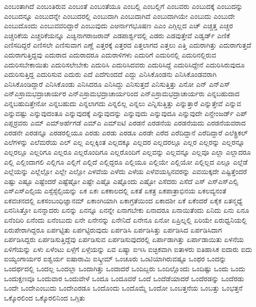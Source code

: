 {ಎಂಬಂತಾಗಿದೆ
ಎಂಬಂತಿರುವ
ಎಂಬಂತೆ
ಎಂಬಂತೆಯೂ
ಎಂಬಲ್ಲಿ
ಎಂಬಲ್ಲಿಗೆ
ಎಂಬವರು
ಎಂಬುದಕ್ಕೆ
ಎಂಬುದನ್ನು
ಎಂಬುದನ್ನೂ
ಎಂಬುದನ್ನೇ
ಎಂಬುದರಲ್ಲಿ
ಎಂಬುದಾಗಿ
ಎಂಬುದಾಗಿದೆ
ಎಂಬುದಾಗಿಯೇ
ಎಂಬುದು
ಎಂಬುದೇ
ಎಂಬುದೊಂದು
ಎಂಬುವವರಿದ್ದಾರೆ
ಎಂಬುವುದು
ಎಆರ್ನಾಗಭೂಷಣ
ಎಎಂ
ಎಗ್ಗಿಲ್ಲದ
ಎಚ್
ಎಚ್ಚತ್ತ
ಎಚ್ಚರ
ಎಚ್ಚರಿಕೆಯ
ಎಚ್ಚರಿಕೆಯನ್ನೂ
ಎಚ್ವಿನಾಗರಾಜರಾವ್
ಎಡಪಾರ್ಶ್ವದಲ್ಲಿ
ಎಡರು
ಎಡವುತ್ತೇವೆ
ಎಡ್ವರ್ಡ್
ಎಣಿಕೆ
ಎಣಿಸದಿದ್ದರೆ
ಎಣಿಸಲೇ
ಎಣಿಸುವಾಗ
ಎಣ್ಣೆ
ಎತ್ತರಕ್ಕೆ
ಎತ್ತರದ
ಎತ್ತಲಾಗದ
ಎತ್ತಲು
ಎತ್ತಿ
ಎದುರಾಗಿತ್ತು
ಎದುರಾಗುತ್ತದೆ
ಎದುರಾಗುತ್ತಿದ್ದವು
ಎದುರಾದ
ಎದುರಾದರೂ
ಎದುರಾಳಿಗಳು
ಎದುರಿಗೆ
ಎದುರಿನಲ್ಲಿ
ಎದುರಿನಲ್ಲಿರುವ
ಎದುರಿಸಬೇಕಾಯಿತು
ಎದುರಿಸಲೇಬೇಕು
ಎದುರಿಸಿ
ಎದುರಿಸಿದವರು
ಎದುರಿಸಿದ್ದೆ
ಎದುರಿಸಿದ್ದೇನೆ
ಎದುರಿಸಿರುವುದೂ
ಎದುರಿಸುತ್ತಿದ್ದ
ಎದುರಿಸುವ
ಎದುರು
ಎದೆ
ಎದೆಗುಂದದೆ
ಎದ್ದು
ಎನಿಸಿಕೊಂಡನು
ಎನಿಸಿಕೊಂಡವರಾಗಿ
ಎನಿಸಿಕೊಂಡಿದ್ದಾರೆ
ಎನಿಸಿಕೊಂಡು
ಎನಿಸಿದರೂ
ಎನಿಸಿದ್ದು
ಎನಿಸುತ್ತದೆ
ಎನಿಸುತ್ತಿತ್ತು
ಎನೋ
ಎನ್
ಎನ್ಎಸ್
ಎನ್ಎಸ್ರಾಮಭದ್ರಾಚಾರ್ಯರ
ಎನ್ಎಸ್ರಾಮಭದ್ರಾಚಾರ್ಯರಿಂದ
ಎನ್ಎಸ್ರಾಮಭದ್ರಾಚಾರ್ಯರು
ಎನ್ನಬಹುದಾದ
ಎನ್ನಬಹುದಿತ್ತೇನೋ
ಎನ್ನಬಹುದು
ಎನ್ನಲಾಗದು
ಎನ್ನಲಿಲ್ಲ
ಎನ್ನಲು
ಎನ್ನಿಸುತ್ತಿತ್ತು
ಎನ್ನುತ್ತಾರೆ
ಎನ್ನುತ್ತೇವೆ
ಎನ್ನುವ
ಎನ್ನುವಷ್ಟು
ಎನ್ನುವುದಂತೂ
ಎನ್ನುವುದಕ್ಕೆ
ಎನ್ನುವುದನ್ನು
ಎನ್ನುವುದು
ಎನ್ನುವುದೂ
ಎನ್ನುವುದೇ
ಎನ್ಡೇಂಜರ್ಡ್
ಎಪ್
ಎಪ್ಲರ್ರವರು
ಎಮ್
ಎಮ್ಅರ್ಹೆಗಡೆ
ಎಮ್ಎ
ಎಮ್ಐಟಿ
ಎರಡನೆ
ಎರಡನೆಯ
ಎರಡನೆಯದು
ಎರಡನೆಯವರಾದ
ಎರಡನೇ
ಎರಡನ್ನೂ
ಎರಡರಲ್ಲಿಯೂ
ಎರಡು
ಎರಡು
ಎರಡೂ
ಎರಡೇ
ಎರೆದ
ಎರೆದಿದ್ದಾನೆ
ಎರೆದಿದ್ದಾರೆ
ಎಲೆಕ್ಟ್ರಿಕಲ್
ಎಲೆಗಳನ್ನು
ಎಲೆಮರೆಯ
ಎಲ್
ಎಲ್ಲ
ಎಲ್ಲಕ್ಕಿಂತ
ಎಲ್ಲದಕ್ಕೂ
ಎಲ್ಲದರ
ಎಲ್ಲದರಲ್ಲೂ
ಎಲ್ಲರ
ಎಲ್ಲರನ್ನು
ಎಲ್ಲರನ್ನೂ
ಎಲ್ಲರಲ್ಲೂ
ಎಲ್ಲರಿಗೂ
ಎಲ್ಲರೂ
ಎಲ್ಲರೊಂದಿಗೂ
ಎಲ್ಲರೊಂದಿಗೆ
ಎಲ್ಲವನ್ನು
ಎಲ್ಲವನ್ನೂ
ಎಲ್ಲವೂ
ಎಲ್ಲಾ
ಎಲ್ಲಾದರೂ
ಎಲ್ಲಿ
ಎಲ್ಲಿಂದಾಗಲಿ
ಎಲ್ಲಿಗೂ
ಎಲ್ಲಿಗೆ
ಎಲ್ಲಿದೆ
ಎಲ್ಲಿದ್ದರೂ
ಎಲ್ಲಿಯೂ
ಎಲ್ಲಿಯೇ
ಎಲ್ಲಿಯೋ
ಎಲ್ಲಿಲ್ಲದ
ಎಲ್ಲೂ
ಎಲ್ಲೆಡೆ
ಎಲ್ಲೆಯನ್ನು
ಎಲ್ಲೆಲ್ಲೋ
ಎಲ್ಲೇ
ಎಲ್ಲೋ
ಎಳವೆಯ
ಎಳೆದು
ಎಳೆಯ
ಎಳೆವಯಸ್ಸಿನವರನ್ನು
ಎವಯಿಕ್ಕದೇ
ಎಷ್ಟಿತ್ತೆಂದರೆ
ಎಷ್ಟು
ಎಷ್ಟೂ
ಎಷ್ಟೆಂದರೆ
ಎಷ್ಟೆಷ್ಟೋ
ಎಷ್ಟೇ
ಎಷ್ಟೊ
ಎಷ್ಟೊಂದು
ಎಷ್ಟೋ
ಎಸೆದರು
ಎಸೆದೆ
ಎಸ್
ಎಸ್ಎಸ್ಎಲ್ಸಿ
ಎಸ್ಎಸ್ಎಲ್ಸಿಯ
ಎಸ್ಸೆಸ್ಸೆಲ್ಸಿಯನ್ನು
ಏಕ
ಏಕಃ
ಏಕಕಾಲದಲ್ಲಿ
ಏಕತೆ
ಏಕತ್ರ
ಏಕಪಾತ್ರಾಭಿನಯ
ಏಕಲವ್ಯನಂತೆ
ಏಕವಚನದಲ್ಲಿ
ಏಕಸಂಬಂಧಿಜ್ಞಾನಮ್
ಏಕಾಂಗಿಯಾಗಿ
ಏಕಾಗ್ರತೆಯಿಂದ
ಏಕಾದಶೀ
ಏಕೆ
ಏಕೆಂದರೆ
ಏಕೈಕ
ಏತನ್ಮಧ್ಯೆ
ಏನನಿಸಿತ್ತೋ
ಏನನ್ನಾದರು
ಏನನ್ನು
ಏನನ್ನೂ
ಏನನ್ನೇ
ಏನಾಗಬೇಕು
ಏನಾದರೂ
ಏನಾಯಿತೆಂದು
ಏನಿದು
ಏನು
ಏನೂ
ಏನೆಂದಿರಿ
ಏನೆಂದು
ಏನೆಂಬುದು
ಏನೇ
ಏನೇನನ್ನು
ಏನೇನಿದೆ
ಏನೇನೂ
ಏನೋ
ಏಪ್ರಿಲ್ನಲ್ಲಿ
ಏರಿಯೇ
ಏರುಧ್ವನಿಯಲ್ಲಿ
ಏರುಪೇರಾಗಿದ್ದರೂ
ಏರ್ಪಟ್ಟಿತು
ಏರ್ಪಟ್ಟಿರುವುದು
ಏರ್ಪಡಿಸಿ
ಏರ್ಪಡಿಸಿತ್ತು
ಏರ್ಪಡಿಸಿದ
ಏರ್ಪಡಿಸಿದಾಗ
ಏರ್ಪಡಿಸಿದ್ದರು
ಏರ್ಪಡಿಸುತ್ತಿದ್ದೆವು
ಏರ್ಪಡಿಸುವ
ಏರ್ಪಡಿಸುವುದರಲ್ಲಿ
ಏರ್ಪಾಡಾಗಿತ್ತು
ಏರ್ಪಾಡಾಯಿತು
ಏಳನೆಯ
ಏಳಿಗೆಯನ್ನು
ಏಳು
ಏಳೆಂಟು
ಏಳ್ಗೆಗೆ
ಏಳ್ಗೆಯನ್ನು
ಏವ
ಏಷ್ಯಾ
ಐಇಸಿ
ಐಚ್ಛಿಕವಾಗಿ
ಐತಾಳರು
ಐತಿಹಾಸಿಕ
ಐದಾರು
ಐದು
ಐಯ್ಯಂಗಾರ್ಯರ
ಐಶ್ವರ್ಯ
ಐಷಾರಾಮಿ
ಐಸ್ಕ್ರೀಮ್
ಒಂಚೂರು
ಒಂಟಿಯಾಗಿರುವಷ್ಟೂ
ಒಂಥರ
ಒಂದನ್ನು
ಒಂದರ್ಥದಲ್ಲಿ
ಒಂದಲ್ಲ
ಒಂದಲ್ಲಾ
ಒಂದಾಗಿತ್ತು
ಒಂದಾದರೆ
ಒಂದಿಬ್ಬರು
ಒಂದಿಲ್ಲೊಂದು
ಒಂದಿಷ್ಟು
ಒಂದು
ಒಂದು
ಒಂದುಕ್ಷಣವೂ
ಒಂದುವಾರ
ಒಂದುವೇಳೆ
ಒಂದೂ
ಒಂದೂವರೆ
ಒಂದೆ
ಒಂದೆಡೆಯಾದರೆ
ಒಂದೆರಡನ್ನು
ಒಂದೆರಡು
ಒಂದೇ
ಒಂದೇಎಂಬುದು
ಒಂದೇಎರಡೂ
ಒಂದೊಂದು
ಒಂದೊಮ್ಮೆ
ಒಂದೋ
ಒಂಬತ್ತನೆಯ
ಒಂಬತ್ತು
ಒಂಭತ್ತನೆ
ಒಕ್ಕೊರಲಿಂದ
ಒಕ್ಕೊರಲಿನಿಂದ
ಒಗ್ಗಿತು
}
